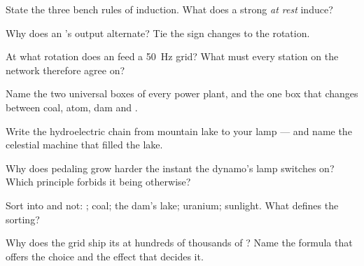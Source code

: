 \begin{exercise}[$\star$]\label{exo:g9:alternator:1}
State the three bench rules of induction. What does a
strong  \emph{at rest} induce?
\end{exercise}

\begin{exercise}[$\star$]\label{exo:g9:alternator:2}
Why does an 's output alternate? Tie the sign
changes to the rotation.
\end{exercise}

\begin{exercise}[$\star$]\label{exo:g9:alternator:3}
At what rotation  does an  feed a
\qty{50}{Hz} grid? What must every station on the network
therefore agree on?
\end{exercise}

\begin{exercise}[$\star$]\label{exo:g9:alternator:4}
Name the two universal boxes of every power plant, and the
one box that changes between coal, atom, dam and .
\end{exercise}

\begin{exercise}[$\star$]\label{exo:g9:alternator:5}
Write the hydroelectric chain from mountain lake to your
lamp --- and name the celestial machine that filled the
lake.
\end{exercise}

\begin{exercise}[$\star$]\label{exo:g9:alternator:6}
Why does pedaling grow harder the instant the dynamo's lamp
switches on? Which principle forbids it being otherwise?
\end{exercise}

\begin{exercise}[$\star$]\label{exo:g9:alternator:7}
Sort into  and not: ; coal; the dam's lake;
uranium; sunlight. What defines the sorting?
\end{exercise}

\begin{exercise}[$\star$]\label{exo:g9:alternator:8}
Why does the grid ship its  at hundreds of thousands
of ? Name the formula that offers the choice and the
effect that decides it.
\end{exercise}

